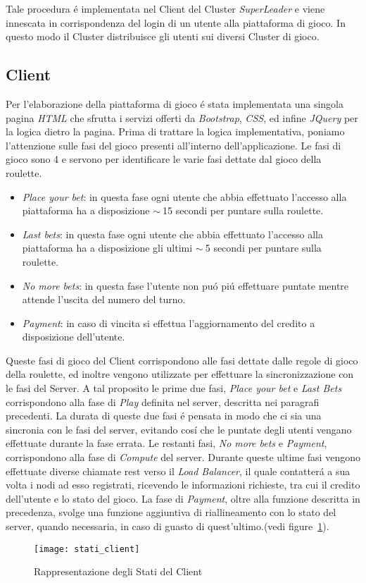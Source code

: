 \documentclass{sig-alternate-05-2015}
\begin{document}
Tale procedura \'e implementata nel Client del Cluster \textit{SuperLeader} e viene innescata in corrispondenza del login di un utente alla piattaforma di gioco. In questo modo il Cluster distribuisce gli utenti sui diversi Cluster di gioco.

\subsection{Client}

Per l'elaborazione della piattaforma di gioco \'e stata implementata una singola pagina \textit{HTML} che sfrutta  i servizi offerti da \textit{Bootstrap}, \textit{CSS}, ed infine \textit{JQuery} per la logica dietro la pagina.
Prima di trattare la logica implementativa, poniamo l'attenzione sulle fasi del gioco presenti all'interno dell'applicazione.
Le fasi di gioco sono 4 e servono per identificare le varie fasi dettate dal gioco della roulette.
\begin{itemize}
\item \textit{Place your bet}: in questa fase ogni utente che abbia effettuato l'accesso alla piattaforma ha a disposizione $\sim{~}$15 secondi per puntare sulla roulette.
\item \textit{Last bets}: in questa fase ogni utente che abbia effettuato l'accesso alla piattaforma ha a disposizione gli ultimi $\sim{~}$5 secondi per puntare sulla roulette.
\item \textit{No more bets}: in questa fase l'utente non pu\'o pi\'u effettuare puntate mentre attende l'uscita del numero del turno.
\item \textit{Payment}: in caso di vincita si effettua l'aggiornamento del credito a disposizione dell'utente.
\end{itemize}

Queste fasi di gioco del Client corrispondono alle fasi dettate dalle regole di gioco della roulette, ed inoltre vengono utilizzate per effettuare la sincronizzazione con le fasi del Server.
A tal proposito le prime due fasi, \textit{Place your bet} e \textit{Last Bets} corrispondono alla fase di \textit{Play} definita nel server, descritta nei paragrafi precedenti. La durata di queste due fasi \'e pensata in modo che ci sia una sincronia con le fasi del server, evitando cos\'i che le puntate degli utenti vengano effettuate durante la fase errata. Le restanti fasi, \textit{No more bets} e \textit{Payment}, corrispondono alla fase di \textit{Compute} del server. Durante queste ultime fasi vengono effettuate diverse chiamate rest verso il \textit{Load Balancer}, il quale contatter\'a a sua volta  i nodi ad esso registrati, ricevendo le informazioni richieste, tra cui il credito dell'utente e lo stato del gioco.
La fase di \textit{Payment}, oltre alla funzione descritta in precedenza, svolge una funzione aggiuntiva di riallineamento con lo stato del server, quando necessaria, in caso di guasto di quest'ultimo.(vedi figure~\ref{fig:clientState}).
 \begin{figure}\centering
 \texttt{[image: stati\_client]} 
 \caption{Rappresentazione degli Stati del Client} 
\label{fig:clientState}
 \end{figure}
\end{document}
